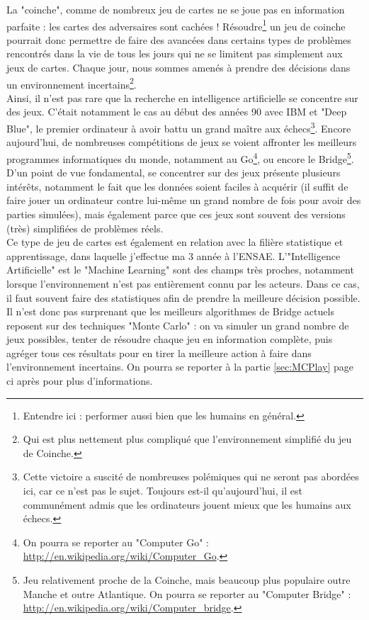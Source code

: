 \documentclass[a4paper,11pt]{article}
\begin{document}
La "coinche", comme de nombreux jeu de cartes ne se joue pas en information parfaite : les cartes des adversaires sont cachées ! Résoudre\footnote{Entendre ici : performer aussi bien que les humains en général.} un jeu de coinche pourrait donc permettre de faire des avancées dans certains types de problèmes rencontrés dans la vie de tous les jours qui ne se limitent pas simplement aux jeux de cartes. Chaque jour, nous sommes amenés à prendre des décisions dans un environnement incertains\footnote{Qui est plus nettement plus compliqué que l'environnement simplifié du jeu de Coinche.}. \\
Ainsi, il n'est pas rare que la recherche en intelligence artificielle se concentre sur des jeux. C'était notamment le cas au début des années 90 avec IBM et "Deep Blue", le premier ordinateur à avoir battu un grand maître aux échecs\footnote{Cette victoire a suscité de nombreuses polémiques qui ne seront pas abordées ici, car ce n'est pas le sujet. Toujours est-il qu'aujourd'hui, il est communément admis que les ordinateurs jouent mieux que les humains aux échecs.}. Encore aujourd'hui, de nombreuses compétitions de jeux se voient affronter les meilleurs programmes informatiques du monde, notamment au Go\footnote{On pourra se reporter au "Computer Go" :  \url{http://en.wikipedia.org/wiki/Computer_Go}.}, ou encore le Bridge\footnote{Jeu relativement proche de la Coinche, mais beaucoup plus populaire outre Manche et outre Atlantique. On pourra se reporter au "Computer Bridge" : \url{http://en.wikipedia.org/wiki/Computer_bridge}.}. D'un point de vue fondamental, se concentrer sur des jeux présente plusieurs intérêts, notamment le fait que les données soient faciles à acquérir (il suffit de faire jouer un ordinateur contre lui-même un grand nombre de fois pour avoir des parties simulées), mais également parce que ces jeux sont souvent des versions (très) simplifiées de problèmes réels. \\
Ce type de jeu de cartes est également en relation avec la filière statistique et apprentissage, dans laquelle j'effectue ma 3\ieme{} année à l'ENSAE. L'"Intelligence Artificielle" est le "Machine Learning" sont des champs très proches, notamment lorsque l'environnement n'est pas entièrement connu par les acteurs. Dans ce cas, il faut souvent faire des statistiques afin de prendre la meilleure décision possible. Il n'est donc pas surprenant que les meilleurs algorithmes de Bridge actuels reposent sur des techniques "Monte Carlo" : on va simuler un grand nombre de jeux possibles, tenter de résoudre chaque jeu en information complète, puis agréger tous ces résultats pour en tirer la meilleure action à faire dans l'environnement incertains. On pourra se reporter à la partie \ref{sec:MCPlay} page \pageref{sec:MCPlay} ci après pour plus d'informations. \\
\end{document}
